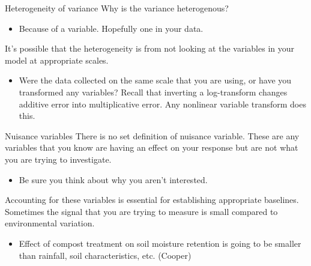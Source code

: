 \documentclass[
  ignorenonframetext,
]{beamer}
\providecommand{\tightlist}{%
  \setlength{\itemsep}{0pt}\setlength{\parskip}{0pt}}
\begin{document}
\begin{frame}{Heterogeneity of variance}
\protect\hypertarget{heterogeneity-of-variance}{}
Why is the variance heterogenous?

\begin{itemize}
\tightlist
\item
  Because of a variable. Hopefully one in your data.
\end{itemize}

It's possible that the heterogeneity is from not looking at the
variables in your model at appropriate scales.

\begin{itemize}
\tightlist
\item
  Were the data collected on the same scale that you are using, or have
  you transformed any variables? Recall that inverting a log-transform
  changes additive error into multiplicative error. Any nonlinear
  variable transform does this.
\end{itemize}
\end{frame}

\begin{frame}{Nuisance variables}
\protect\hypertarget{nuisance-variables}{}
There is no set definition of nuisance variable. These are any variables
that you know are having an effect on your response but are not what you
are trying to investigate.

\begin{itemize}
\tightlist
\item
  Be sure you think about why you aren't interested.
\end{itemize}

Accounting for these variables is essential for establishing appropriate
baselines. Sometimes the signal that you are trying to measure is small
compared to environmental variation.

\begin{itemize}
\tightlist
\item
  Effect of compost treatment on soil moisture retention is going to be
  smaller than rainfall, soil characteristics, etc. (Cooper)
\end{itemize}
\end{frame}
\end{document}
